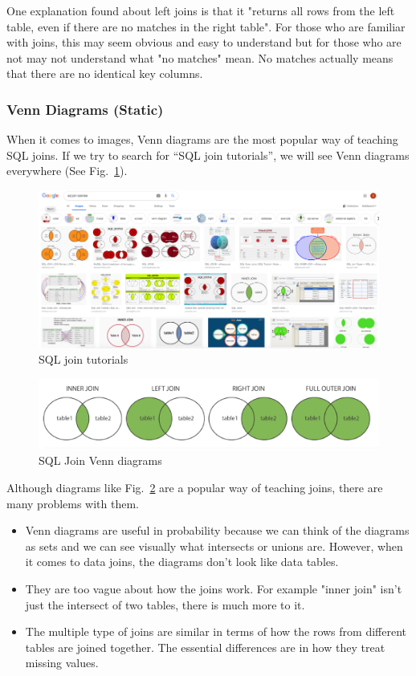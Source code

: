 One explanation found about left joins is that it "returns all rows from the left table, even if there are no matches in the right table". For those who are familiar with joins, this may seem obvious and easy to understand but for those who are not may not understand what "no matches" mean. No matches actually means that there are no identical key columns. 

\subsubsection{Venn Diagrams (Static)}
When it comes to images, Venn diagrams are the most popular way of teaching \textsf{SQL} joins. If we try to search for “SQL join tutorials”, we will see Venn diagrams everywhere (See Fig.~\ref{fig:vennsearch}).

\begin{figure}[H]
    \centering
    \includegraphics[scale = 1.0]{Masters-Thesis/img/vennsearch.png}
    \caption{\textsf{SQL} join tutorials}
    \label{fig:vennsearch}
\end{figure}

\begin{figure}[H]
    \centering
    \includegraphics[scale = 0.8]{Masters-Thesis/img/venn.png}
    \caption{\textsf{SQL} Join Venn diagrams}
    \label{fig:venn}
\end{figure}

Although diagrams like Fig.~\ref{fig:venn} are a popular way of teaching joins, there are many problems with them.

\begin{itemize}
    \item Venn diagrams are useful in probability because we can think of the diagrams as sets and we can see visually what intersects or unions are. However, when it comes to data joins, the diagrams don’t look like data tables.
    \item They are too vague about how the joins work. For example "inner join" isn’t just the intersect of two tables, there is much more to it. 
    \item The multiple type of joins are similar in terms of how the rows from different tables are joined together. The essential differences are in how they treat missing values.
\end{itemize}

